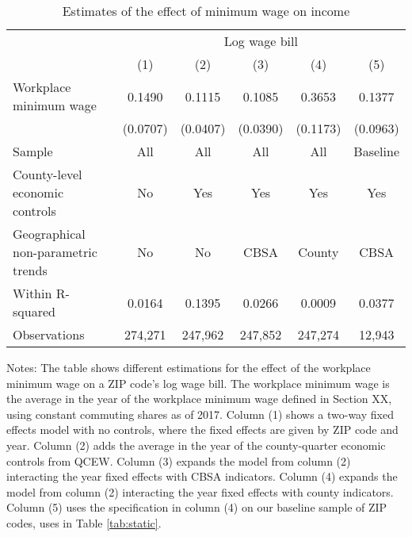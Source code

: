 \begin{table}[]
    \caption{Estimates of the effect of minimum wage on income}
    \label{tab:static_wages}

    \begin{tabular}{@{}lccccc@{}}
        \toprule
                                        & \multicolumn{5}{c}{Log wage bill}                         \\ \cmidrule(l){2-6} 
                                        & (1)       & (2)      & (3)      & (4)      & (5)          \\ \midrule
        Workplace minimum wage             & 0.1490    & 0.1115   & 0.1085   & 0.3653      & 0.1377     \\
                                        & (0.0707)  & (0.0407) & (0.0390) & (0.1173)    & (0.0963)   \\ \midrule
        Sample                             & All       & All      & All      & All       & Baseline     \\
        County-level economic controls     & No        & Yes      & Yes      & Yes       & Yes          \\
        Geographical non-parametric trends & No        & No       & CBSA     & County     & CBSA         \\
        Within R-squared                   & 0.0164   & 0.1395   & 0.0266   & 0.0009     & 0.0377        \\
        Observations                       & 274,271   & 247,962  & 247,852  & 247,274    & 12,943       \\ \bottomrule
    \end{tabular}
    
    \begin{minipage}{.95\textwidth} \footnotesize
        \vspace{2mm}
        Notes: The table shows different estimations for the effect of the workplace minimum 
        wage on a ZIP code's log wage bill.
        The workplace minimum wage is the average in the year of the workplace minimum wage 
        defined in Section XX, using constant commuting shares as of 2017.
        Column (1) shows a two-way fixed effects model with no controls, where the fixed 
        effects are given by ZIP code and year.
        Column (2) adds the average in the year of the county-quarter economic controls from
        QCEW.
        Column (3) expands the model from column (2) interacting the year fixed effects 
        with CBSA indicators.
        Column (4) expands the model from column (2) interacting the year fixed effects 
        with county indicators.
        Column (5) uses the specification in column (4) on our baseline sample of ZIP codes,
        uses in Table \ref{tab:static}.
    \end{minipage}
\end{table}

